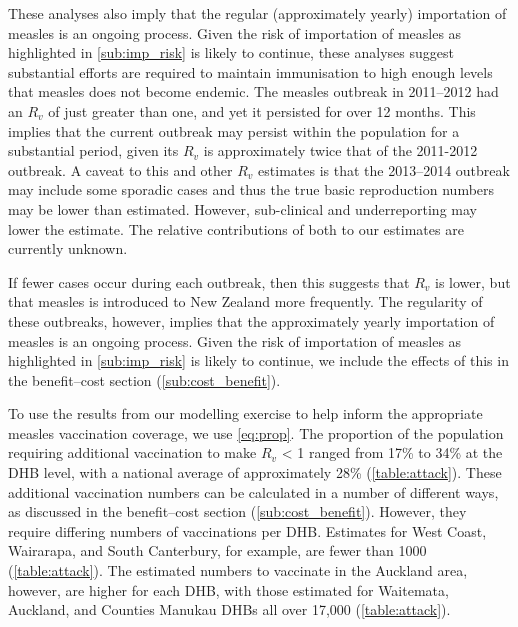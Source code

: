 \documentclass{article}
\begin{document}
These analyses also imply that the regular (approximately yearly) importation of measles is an ongoing process. Given the risk of importation of measles as highlighted in \autoref{sub:imp_risk} is likely to continue, these analyses suggest substantial efforts are required to maintain immunisation to high enough levels that measles does not become endemic. The measles outbreak in 2011--2012 had an $R_v$ of just greater than one, and yet it persisted for over 12 months. This implies that the current outbreak may persist within the population for a substantial period, given its $R_v$ is approximately twice that of the 2011-2012 outbreak. A caveat to this and other $R_v$ estimates is that the 2013--2014 outbreak may include some sporadic cases and thus the true basic reproduction numbers may be lower than estimated. However, sub-clinical and underreporting may lower the estimate. The relative contributions of both to our estimates are currently unknown. 

If fewer cases occur during each outbreak, then this suggests that $R_v$ is lower, but that measles is introduced to New Zealand more frequently. The regularity of these outbreaks, however, implies that the approximately yearly importation of measles is an ongoing process. Given the risk of importation of measles as highlighted in \autoref{sub:imp_risk} is likely to continue, we include the effects of this in the benefit--cost section (\autoref{sub:cost_benefit}).

To use the results from our modelling exercise to help inform the appropriate measles vaccination coverage, we use \autoref{eq:prop}. The proportion of the population requiring additional vaccination to make $R_v$ < 1 ranged from 17\% to 34\% at the DHB level, with a national average of approximately 28\% (\autoref{table:attack}). These additional vaccination numbers can be calculated in a number of different ways, as discussed in the benefit--cost section (\autoref{sub:cost_benefit}). However, they require differing numbers of vaccinations per DHB. Estimates for West Coast, Wairarapa, and South Canterbury, for example, are fewer than 1000 (\autoref{table:attack}). The estimated numbers to vaccinate in the Auckland area, however, are higher for each DHB, with those estimated for Waitemata, Auckland, and Counties Manukau DHBs all over 17,000  (\autoref{table:attack}).
\end{document}
